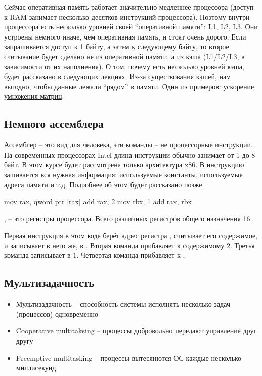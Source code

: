   Сейчас оперативная память работает значительно медленнее процессора (доступ к RAM занимает несколько десятков инструкций процессора). Поэтому внутри процессора есть несколько уровней своей ``оперативной памяти'': L1, L2, L3. Они устроены немного иначе, чем оперативная память, и стоят очень дорого. Если запрашивается доступ к 1 байту, а затем к следующему байту, то второе считывание будет сделано не из оперативной памяти, а из кэша (L1/L2/L3, в зависимости от их наполнения). О том, почему есть несколько уровней кэша, будет рассказано в следующих лекциях.
  Из-за существования кэшей, нам выгодно, чтобы данные лежали ``рядом'' в памяти. Один из примеров: \href{https://levelup.gitconnected.com/c-programming-hacks-4-matrix-multiplication-are-we-doing-it-right-21a9f1cbf53}{ускорение умножения матриц}.
  
  \subsection{Немного ассемблера}
  Ассемблер -- это вид для человека, эти команды -- не процессорные инструкции. На современных процессорах Intel длина инструкции обычно занимает от 1 до 8 байт. В этом курсе будет рассмотрена только архитектура x86. В инструкцию зашивается вся нужная информация: используемые константы, используемые адреса памяти и т.д. Подробнее об этом будет рассказано позже.

\begin{asmminted}
mov rax, qword ptr [rax]
add rax, 2
mov rbx, 1
add rax, rbx
\end{asmminted}

,  -- это регистры процессора. Всего различных регистров общего назначения 16. \newline

Первая инструкция в этом коде берёт адрес регистра , считывает его содержимое, и записывает в него же, в . \newline
Вторая команда прибавляет к содержимому  $2$. \newline
Третья команда записывает в  $1$. \newline
Четвертая команда прибавляет  к .
        
    \subsection{Мультизадачность}
    \begin{itemize}
      \item Мультизадачность -- способность системы исполнять несколько задач (процессов) одновременно
      \item Cooperative multitaksing -- процессы добровольно передают управление друг другу
      \item Preemptive multitasking -- процессы вытесянются ОС каждые несколько миллисекунд
    \end{itemize}
    

